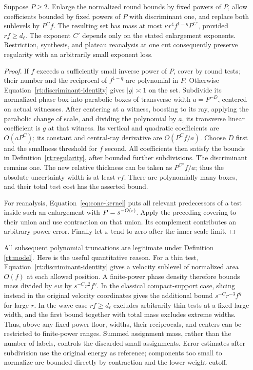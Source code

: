 \begin{lemma}\label{rt:covering}
Suppose $P\ge2$.  Enlarge the normalized round bounds by fixed powers of
$P$, allow coefficients bounded by fixed powers of $P$ with discriminant
one, and replace both sublevels by $P^Cf$.  The resulting set has mass at
most $\kappa r^4f^{1-\eta}P^{C'}$, provided $rf\ge d_\ell$.
The exponent $C'$ depends only on the stated enlargement exponents.
Restriction, synthesis, and plateau reanalysis at one cut consequently
preserve regularity with an arbitrarily small exponent loss.
\end{lemma}

\begin{proof}
If $f$ exceeds a sufficiently small inverse power of $P$, cover by round
tests; their number and the reciprocal of $f^{1-\eta}$ are polynomial in
$P$.  Otherwise Equation~\eqref{rt:discriminant-identity} gives
$|g|\asymp1$ on the set.  Subdivide its normalized phase box into parabolic
boxes of transverse width $a=P^{-D}$, centered on actual witnesses.
After centering at a witness, boosting to its ray, applying the parabolic
change of scale, and dividing the polynomial by $a$, its transverse
linear coefficient is $g$ at that witness.  Its vertical and quadratic
coefficients are $O(aP^C)$; its constant and central-ray derivative are
$O(P^Cf/a)$.  Choose $D$ first and the smallness threshold for $f$ second.
All coefficients then satisfy the bounds in Definition~\ref{rt:regularity},
after bounded further subdivisions.  The discriminant remains one.
The new relative thickness can be taken as $P^{C''}f/a$; thus the
absolute uncertainty width is at least $rf$.  There are polynomially
many boxes, and their total test cost has the asserted bound.

For reanalysis, Equation~\eqref{eq:cone-kernel} puts all relevant
predecessors of a test inside such an enlargement with $P=s^{-O(\varepsilon)}$.
Apply the preceding covering to their union and use contraction on that
union.  Its complement contributes an arbitrary power error.  Finally let
$\varepsilon$ tend to zero after the inner scale limit.
\end{proof}

All subsequent polynomial truncations are legitimate under Definition~
\ref{rt:model}.  Here is the useful quantitative reason.  For a thin test,
Equation~\eqref{rt:discriminant-identity} gives a velocity sublevel of
normalized area $O(f)$ at each allowed position.  A finite-power phase
density therefore bounds mass divided by $ew$ by
$s^{-C}r^2f^\eta$.  In the classical compact-support case, slicing instead
in the original velocity coordinates gives the additional bound
$s^{-C}r^{-3}f^\eta$ for large $r$.  In the wave case $rf\ge d_\ell$
excludes arbitrarily thin tests at a fixed large width, and the first
bound together with total mass excludes extreme widths.  Thus, above any
fixed power floor, widths, their reciprocals, and centers can be restricted
to finite-power ranges.  Summed assignment mass, rather than the number
of labels, controls the discarded small assignments.  Error estimates
after subdivision use the original energy as reference; components too
small to normalize are bounded directly by contraction and the lower
weight cutoff.

